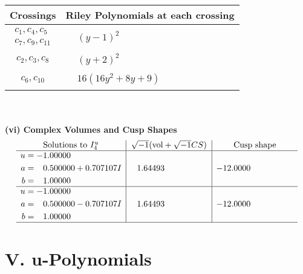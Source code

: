 \documentclass[1p]{elsarticle_modified}
\theoremstyle{definition}
\newcommand{\I}{\sqrt{-1}}
\begin{document}
\begin{tabular}{m{50pt}|m{274pt}}
Crossings & \hspace{64pt}Riley Polynomials at each crossing \\
\hline $$\begin{aligned}c_{1},c_{4},c_{5}\\c_{7},c_{9},c_{11}\end{aligned}$$&$\begin{aligned}
&(y-1)^2
\end{aligned}$\\
\hline $$\begin{aligned}c_{2},c_{3},c_{8}\end{aligned}$$&$\begin{aligned}
&(y+2)^2
\end{aligned}$\\
\hline $$\begin{aligned}c_{6},c_{10}\end{aligned}$$&$\begin{aligned}
&16(16 y^2+8 y+9)
\end{aligned}$\\
\hline
\end{tabular}\\~\\
\newpage\flushleft \textbf{(vi) Complex Volumes and Cusp Shapes}
$$\begin{array}{c|c|c}  
\text{Solutions to }I^u_{4}& \I (\text{vol} + \sqrt{-1}CS) & \text{Cusp shape}\\
 \hline 
\begin{aligned}
u &= -1.00000\phantom{ +0.000000I} \\
a &= \phantom{-}0.500000 + 0.707107 I \\
b &= \phantom{-}1.00000\phantom{ +0.000000I}\end{aligned}
 & \phantom{-}1.64493\phantom{ +0.000000I} & -12.0000\phantom{ +0.000000I} \\ \hline\begin{aligned}
u &= -1.00000\phantom{ +0.000000I} \\
a &= \phantom{-}0.500000 - 0.707107 I \\
b &= \phantom{-}1.00000\phantom{ +0.000000I}\end{aligned}
 & \phantom{-}1.64493\phantom{ +0.000000I} & -12.0000\phantom{ +0.000000I}\\
 \hline 
 \end{array}$$\newpage
\newpage\renewcommand{\arraystretch}{1}
\centering \section*{ V. u-Polynomials}
\end{document}
